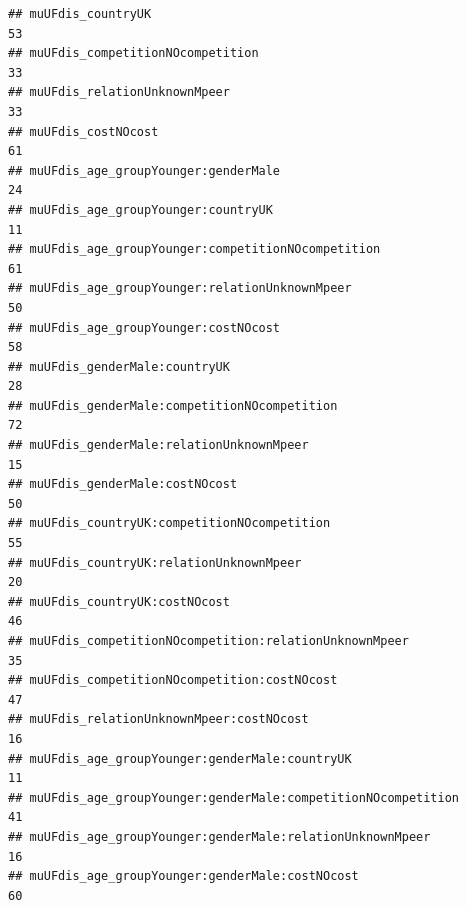 \documentclass[
]{article}
\begin{document}
\begin{verbatim}
## muUFdis_countryUK                                                                                            53
## muUFdis_competitionNOcompetition                                                                             33
## muUFdis_relationUnknownMpeer                                                                                 33
## muUFdis_costNOcost                                                                                           61
## muUFdis_age_groupYounger:genderMale                                                                          24
## muUFdis_age_groupYounger:countryUK                                                                           11
## muUFdis_age_groupYounger:competitionNOcompetition                                                            61
## muUFdis_age_groupYounger:relationUnknownMpeer                                                                50
## muUFdis_age_groupYounger:costNOcost                                                                          58
## muUFdis_genderMale:countryUK                                                                                 28
## muUFdis_genderMale:competitionNOcompetition                                                                  72
## muUFdis_genderMale:relationUnknownMpeer                                                                      15
## muUFdis_genderMale:costNOcost                                                                                50
## muUFdis_countryUK:competitionNOcompetition                                                                   55
## muUFdis_countryUK:relationUnknownMpeer                                                                       20
## muUFdis_countryUK:costNOcost                                                                                 46
## muUFdis_competitionNOcompetition:relationUnknownMpeer                                                        35
## muUFdis_competitionNOcompetition:costNOcost                                                                  47
## muUFdis_relationUnknownMpeer:costNOcost                                                                      16
## muUFdis_age_groupYounger:genderMale:countryUK                                                                11
## muUFdis_age_groupYounger:genderMale:competitionNOcompetition                                                 41
## muUFdis_age_groupYounger:genderMale:relationUnknownMpeer                                                     16
## muUFdis_age_groupYounger:genderMale:costNOcost                                                               60

\end{verbatim}
\end{document}
